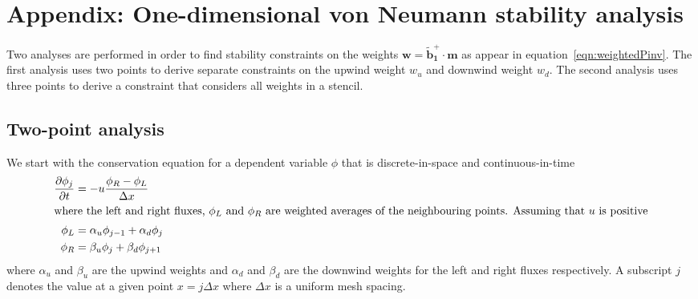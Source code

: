 \section*{Appendix: One-dimensional von Neumann stability analysis}
Two analyses are performed in order to find stability constraints on the weights $\mathbf{w} = \mathbf{\tilde{b}_1^+} \cdot \mathbf{m}$ as appear in equation~\eqref{eqn:weightedPinv}.  The first analysis uses two points to derive separate constraints on the upwind weight $w_u$ and downwind weight $w_d$.  The second analysis uses three points to derive a constraint that considers all weights in a stencil.

\subsection*{Two-point analysis}
We start with the conservation equation for a dependent variable $\phi$ that is discrete-in-space and continuous-in-time
\begin{align}
\frac{\partial \phi_j}{\partial t} &= - u \frac{\phi_R - \phi_L}{\Delta x} \label{eqn:advectionLR} \\
%
\shortintertext{where the left and right fluxes, $\phi_L$ and $\phi_R$ are weighted averages of the neighbouring points.  Assuming that $u$ is positive}
%
\phi_L &= \alpha_u \phi_{j-1} + \alpha_d \phi_j \\
\phi_R &= \beta_u \phi_j + \beta_d \phi_{j+1}
\end{align}
where $\alpha_u$ and $\beta_u$ are the upwind weights and $\alpha_d$ and $\beta_d$ are the downwind weights for the left and right fluxes respectively.  A subscript $j$ denotes the value at a given point $x = j \Delta x$ where $\Delta x$ is a uniform mesh spacing.

